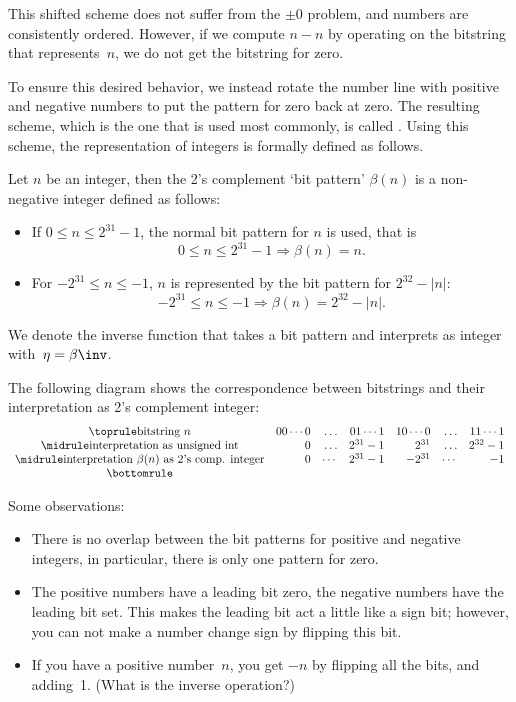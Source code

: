 This shifted scheme does not suffer from the $\pm0$ problem, and
numbers are consistently ordered. However, if we compute $n-n$
by operating on the bitstring that represents~$n$, we do not 
get the bitstring for zero.

To ensure this desired behavior,
we instead rotate the number line with positive and negative numbers
to put the pattern for zero back at zero.
The resulting scheme, which is the one that is used most commonly, is
called . Using this scheme,
the representation of integers is
formally defined as follows.
\begin{definition}
  Let $n$ be an integer, then the 2's complement `bit pattern'
  $\beta(n)$ is a non-negative integer defined as follows:
  \begin{itemize}
  \item If $0\leq n\leq 2^{31}-1$, the normal bit pattern for $n$ is
    used, that is
    \begin{equation}
      0\leq n\leq 2^{31}-1 \Rightarrow \beta(n) = n.
    \end{equation}
  \item For $-2^{31}\leq n\leq -1$, $n$ is represented by the bit
    pattern for $2^{32}-|n|$:
    \begin{equation}
      -2^{31}\leq n\leq -1 \Rightarrow \beta(n) = 2^{32}-|n|.
    \end{equation}
  \end{itemize}
  We denote the inverse function that takes a bit pattern and
  interprets as integer with~$\eta=\beta\inv$.
\end{definition}

The following diagram shows the correspondence between bitstrings and
their interpretation as 2's complement integer:
\begin{equation}
\begin{array}{crrrrrr}
  \toprule
  \hbox{bitstring $n$}&
  00\cdots0&\ldots&01\cdots1&
  10\cdots0&\ldots&11\cdots1\\ \midrule
  \hbox{interpretation as unsigned int}&
  0&\ldots&2^{31}-1&
  2^{31}&\ldots&2^{32}-1\\ \midrule
  \hbox{interpretation $\beta(n)$ as 2's comp. integer}&
  0&\cdots&2^{31}-1&
  -2^{31}&\cdots&-1\\
  \bottomrule
\end{array}
\end{equation}

Some observations:
\begin{itemize}
\item There is no overlap between the bit patterns for positive and
  negative integers, in particular, there is only one pattern for zero.
\item The positive numbers have a leading bit zero, the negative
  numbers have the leading bit set.
  This makes the leading bit act a little like a sign bit;
  however, you can not make a number change sign by flipping this bit.
\item If you have a positive number~$n$, you get $-n$ by flipping
  all the bits, and adding~1. (What is the inverse operation?)
\end{itemize}

